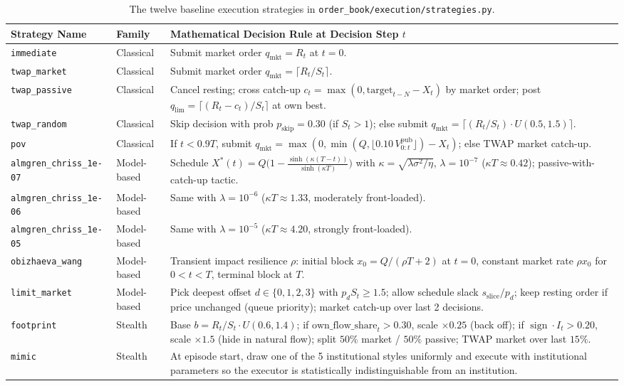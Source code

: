 \documentclass[11pt,a4paper]{article}
\newcommand{\code}[1]{\texttt{#1}}
\newcommand{\sign}{\operatorname{sign}}
\begin{document}
\begin{table}[h!]
\centering\small\setlength{\tabcolsep}{4pt}
\begin{tabular}{L{3.2cm} L{2.0cm} L{8.5cm}}
\toprule
Strategy Name & Family & Mathematical Decision Rule at Decision Step $t$ \\
\midrule
\code{immediate} & Classical & Submit market order $q_{\text{mkt}} = R_t$ at $t=0$. \\
\code{twap\_market} & Classical & Submit market order $q_{\text{mkt}} = \lceil R_t / S_t \rceil$. \\
\code{twap\_passive} & Classical & Cancel resting; cross catch-up $c_t = \max(0, \text{target}_{t-N} - X_t)$ by market order; post $q_{\text{lim}} = \lceil (R_t - c_t)/S_t \rceil$ at own best. \\
\code{twap\_random} & Classical & Skip decision with prob $p_{\text{skip}} = 0.30$ (if $S_t > 1$); else submit $q_{\text{mkt}} = \lceil (R_t/S_t)\cdot U(0.5, 1.5) \rceil$. \\
\code{pov} & Classical & If $t < 0.9T$, submit $q_{\text{mkt}} = \max(0, \min(Q, \lfloor 0.10\,V^{\text{pub}}_{0:t}\rfloor) - X_t)$; else TWAP market catch-up. \\
\midrule
\code{almgren\_chriss\_1e-07} & Model-based & Schedule $X^*(t) = Q\big(1 - \frac{\sinh(\kappa(T-t))}{\sinh(\kappa T)}\big)$ with $\kappa = \sqrt{\lambda\sigma^2/\eta}$, $\lambda = 10^{-7}$ ($\kappa T \approx 0.42$); passive-with-catch-up tactic. \\
\code{almgren\_chriss\_1e-06} & Model-based & Same with $\lambda = 10^{-6}$ ($\kappa T \approx 1.33$, moderately front-loaded). \\
\code{almgren\_chriss\_1e-05} & Model-based & Same with $\lambda = 10^{-5}$ ($\kappa T \approx 4.20$, strongly front-loaded). \\
\code{obizhaeva\_wang} & Model-based & Transient impact resilience $\rho$: initial block $x_0 = Q/(\rho T + 2)$ at $t=0$, constant market rate $\rho x_0$ for $0 < t < T$, terminal block at $T$. \\
\code{limit\_market} & Model-based & Pick deepest offset $d \in \{0,1,2,3\}$ with $p_d S_t \ge 1.5$; allow schedule slack $s_{\text{slice}}/p_d$; keep resting order if price unchanged (queue priority); market catch-up over last 2 decisions. \\
\midrule
\code{footprint} & Stealth & Base $b = R_t/S_t \cdot U(0.6, 1.4)$; if $\text{own\_flow\_share}_t > 0.30$, scale $\times 0.25$ (back off); if $\sign\cdot I_t > 0.20$, scale $\times 1.5$ (hide in natural flow); split $50\%$ market / $50\%$ passive; TWAP market over last $15\%$. \\
\code{mimic} & Stealth & At episode start, draw one of the 5 institutional styles uniformly and execute with institutional parameters so the executor is statistically indistinguishable from an institution. \\
\bottomrule
\end{tabular}
\caption{The twelve baseline execution strategies in \code{order\_book/execution/strategies.py}.}
\label{tab:baselines}
\end{table}
\end{document}
